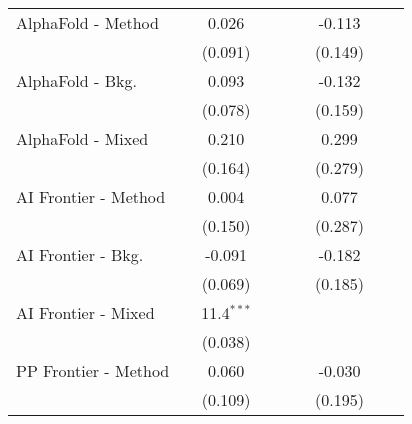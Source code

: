 \begin{tabular}{lcccccccc}
   AlphaFold - Method                             &               & 0.026        &        &        &               & -0.113        &        &   \\   
                                                  &               & (0.091)      &        &        &               & (0.149)       &        &   \\   
   AlphaFold - Bkg.                               &               & 0.093        &        &        &               & -0.132        &        &   \\   
                                                  &               & (0.078)      &        &        &               & (0.159)       &        &   \\   
   AlphaFold - Mixed                              &               & 0.210        &        &        &               & 0.299         &        &   \\   
                                                  &               & (0.164)      &        &        &               & (0.279)       &        &   \\   
   AI Frontier - Method                           &               & 0.004        &        &        &               & 0.077         &        &   \\   
                                                  &               & (0.150)      &        &        &               & (0.287)       &        &   \\   
   AI Frontier - Bkg.                             &               & -0.091       &        &        &               & -0.182        &        &   \\   
                                                  &               & (0.069)      &        &        &               & (0.185)       &        &   \\   
   AI Frontier - Mixed                            &               & 11.4$^{***}$ &        &        &               &               &        &   \\   
                                                  &               & (0.038)      &        &        &               &               &        &   \\   
   PP Frontier - Method                           &               & 0.060        &        &        &               & -0.030        &        &   \\   
                                                  &               & (0.109)      &        &        &               & (0.195)       &        &   \\   

\end{tabular}
